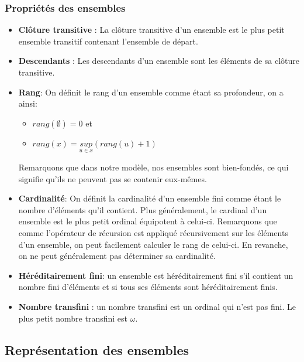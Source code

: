 \documentclass[a4paper, 11pt]{article}
\begin{document}
\subsubsection{Propriétés des ensembles}

\begin{itemize}
    \item \textbf{Clôture transitive} \label{cloture transitive}: La clôture transitive d'un ensemble
    est le plus petit ensemble transitif contenant l'ensemble de départ.
    \item \textbf{Descendants} \label{descendants}: Les descendants d'un ensemble sont les éléments de
    sa clôture transitive.
    \item \textbf{Rang}: \label{rang} On définit le rang d'un ensemble comme étant sa profondeur, 
    on a ainsi:
    \begin{itemize}
        \item $rang(\emptyset) = 0$ et
        \item $rang(x) = \underset{u \in x}{sup}(rang(u) + 1)$
    \end{itemize}
    Remarquons que dans notre modèle, nos ensembles sont bien-fondés, ce qui signifie
    qu'ils ne peuvent pas se contenir eux-mêmes.
    \item \textbf{Cardinalité}: On définit la cardinalité d'un ensemble fini comme 
    étant le nombre d'éléments qu'il contient. Plus généralement, le cardinal d'un
    ensemble est le plus petit ordinal équipotent à celui-ci.
    Remarquons que comme l'opérateur de récursion est appliqué récursivement sur 
    les éléments d'un ensemble, on peut facilement calculer le rang de celui-ci.
    En revanche, on ne peut généralement pas déterminer sa cardinalité.
    \item \textbf{Héréditairement fini}: un ensemble est héréditairement fini s'il
    contient un nombre fini d'éléments et si tous ses éléments sont héréditairement finis.
    \item \textbf{Nombre transfini} \label{transfinie}: un nombre transfini est un ordinal qui n'est pas fini.
    Le plus petit nombre transfini est $\omega$.
\end{itemize}

\subsection{Représentation des ensembles}

\def\bigdot{\ensuremath{\adjustbox{scale=2,raise=-0.35em}{$\cdot$}}}
\end{document}
